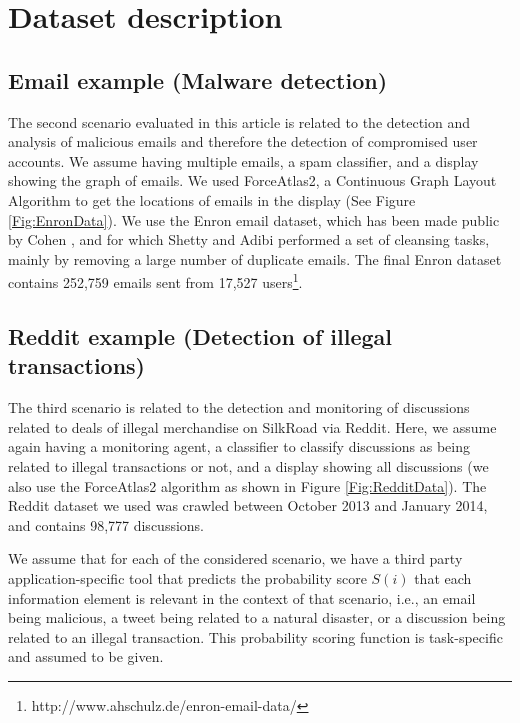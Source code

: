 \section{Dataset description}
\subsection{Email example (Malware detection)}
The second scenario evaluated in this article is related to the detection and analysis of malicious emails and therefore the detection of compromised user accounts. We assume having multiple emails, a spam classifier, and a display showing the graph of emails. We used ForceAtlas2, a Continuous Graph Layout Algorithm \cite{Jacomy2014} to get the locations of emails in the display (See Figure \ref{Fig:EnronData}).
We use the Enron email dataset, which has been made public by Cohen  \cite{Klimt2004}, and for which Shetty and Adibi \cite{Shetty2004} performed a set of
cleansing tasks, mainly by removing a large number of duplicate emails.  The final Enron dataset contains 252,759 emails sent from 17,527 users\footnote{http://www.ahschulz.de/enron-email-data/}.


\subsection{Reddit example (Detection of illegal transactions)}
The third scenario is related to the detection and monitoring of discussions related to deals of illegal merchandise on SilkRoad via Reddit. Here, we assume again having a monitoring agent, a classifier to classify discussions as being related to illegal transactions or not, and a display showing all discussions (we also use the ForceAtlas2 algorithm as shown in Figure \ref{Fig:RedditData}).
The Reddit dataset we used was crawled between October 2013 and January 2014, and contains 98,777 discussions.

We assume that for each of the considered scenario,  we have a third party application-specific tool that predicts the probability score $S(i)$ that each information element is relevant in the context of that scenario, i.e., an email being malicious, a tweet being related to a natural disaster, or a discussion being related to an illegal transaction. This probability scoring function is task-specific and assumed to be given. 

